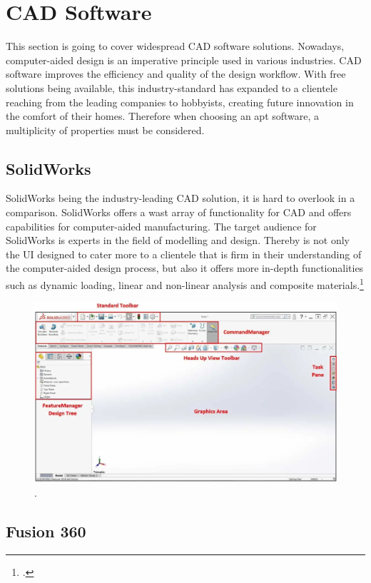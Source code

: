 \section{CAD Software}

This section is going to cover widespread CAD software solutions. Nowadays, computer-aided design is an imperative principle used in various industries. CAD software improves the efficiency and quality of the design workflow. With free solutions being available, this industry-standard has expanded to a clientele reaching from the leading companies to hobbyists, creating future innovation in the comfort of their homes. Therefore when choosing an apt software, a multiplicity of properties must be considered.

\subsection{SolidWorks}

SolidWorks being the industry-leading CAD solution, it is hard to overlook in a comparison. SolidWorks offers a wast array of functionality for CAD and offers capabilities for computer-aided manufacturing. 
The target audience for SolidWorks is experts in the field of modelling and design. Thereby is not only the UI designed to cater more to a clientele that is firm in their understanding of the computer-aided design process, but also it offers more in-depth functionalities such as dynamic loading, linear and non-linear analysis and composite materials.\footcite{all3dpSolidWorksVsFusion2021}

\begin{figure}[h]
	\centering
	\includegraphics[width=0.6\linewidth]{img/SolidWorksUI}
	\caption{.}
	\label{fig:custom_parts_solidworks}
\end{figure}


\subsection{Fusion 360}

